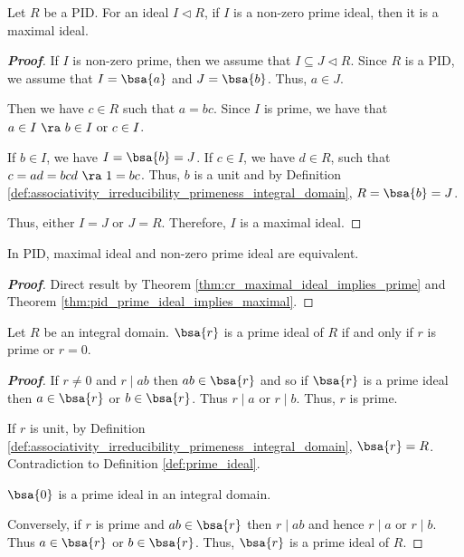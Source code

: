 \begin{theorem}\label{thm:pid_prime_ideal_implies_maximal}
Let $R$ be a PID. For an ideal $I \lhd R$, if $I$ is a non-zero prime ideal, then it is a maximal ideal.
\end{theorem}

\begin{proof}[\bf Proof]
If $I$ is non-zero prime, then we assume that $I\subseteq J\lhd R$. Since $R$ is a PID, we assume that $I = \bsa{a}$ and $J = \bsa{b}$. Thus, $a\in J$.

Then we have $c\in R$ such that $a = bc$. Since $I$ is prime, we have that $a\in I \ \ra \ b\in I\text{ or }c\in I$.

If $b\in I$, we have $I = \bsa{b} = J$. If $c\in I$, we have $d\in R$, such that $c = ad = bcd \ \ra \ 1 = bc$. Thus, $b$ is a unit and by Definition \ref{def:associativity_irreducibility_primeness_integral_domain}, $R = \bsa{b} = J$.

Thus, either $I=J$ or $J=R$. Therefore, $I$ is a maximal ideal.
\end{proof}

\begin{theorem}\label{thm:pid_prime_ideal_equals_maximal}
In PID, maximal ideal and non-zero prime ideal are equivalent.
\end{theorem}

\begin{proof}[\bf Proof]
Direct result by Theorem \ref{thm:cr_maximal_ideal_implies_prime} and Theorem \ref{thm:pid_prime_ideal_implies_maximal}.
\end{proof}



\begin{lemma}\label{lem:prime_ideal_prime_ring_element}
Let $R$ be an integral domain. $\bsa{r}$ is a prime ideal of $R$ if and only if $r$ is prime or $r = 0$.
\end{lemma}

\begin{proof}[\bf Proof]
If $r \neq 0$ and $r \mid ab$ then $ab \in \bsa{r}$ and so if $\bsa{r}$ is a prime ideal then $a \in \bsa{r}$ or $b \in \bsa{r}$. Thus $r \mid a$ or $r \mid b$. Thus, $r$ is prime.

If $r$ is unit, by Definition \ref{def:associativity_irreducibility_primeness_integral_domain}, $\bsa{r} = R$. Contradiction to Definition \ref{def:prime_ideal}.

$\bsa{0}$ is a prime ideal in an integral domain.

Conversely, if $r$ is prime and $ab \in \bsa{r}$ then $r \mid ab$ and hence $r \mid a$ or $r \mid b$. Thus $a \in \bsa{r}$ or $b \in \bsa{r}$. Thus, $\bsa{r}$ is a prime ideal of $R$.
\end{proof}


